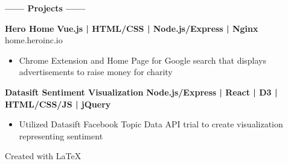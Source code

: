 \documentclass[12pt]{article}
\begin{document}
\colorbox{secondary}{
    \parbox{45em}{
    \color{white}
    \begin{center}
    \textbf{\Large------ Projects ------}\\
    \end{center}
    
    \vspace{-2mm}
    \begin{footnotesize}

    \textbf{\color{primary}\large Hero Home } \hfill \textbf{\color{Cerulean}Vue.js | HTML/CSS | Node.js/Express | Nginx }\\
    {\color{primary}\footnotesize home.heroinc.io}
    \begin{itemize}
        \item Chrome Extension and Home Page for Google search that displays advertisements to raise money for charity
    \end{itemize}


    \flushleft

    \textbf{\color{primary}\large Datasift Sentiment Visualization} \hfill \textbf{\color{Cerulean} Node.js/Express | React | D3 | HTML/CSS/JS | jQuery}
    \begin{itemize}
        \item Utilized Datasift Facebook Topic Data API trial to create visualization representing sentiment 
    \end{itemize}

    \end{footnotesize}
}}

\center
Created with \LaTeX
\end{document}
